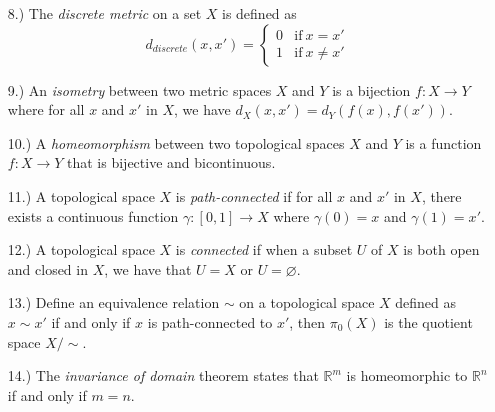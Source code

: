 \documentclass[12pt]{article}
\newcommand{\R}{\mathbb{R}}
\begin{document}
\begin{itemize}
    \item [8.)] The \textit{discrete metric} on a set $X$ is defined as
    \[
        d_{discrete}(x,x') = \begin{cases}
            0 & \text{if}\ x = x' \\
            1 & \text{if}\ x \ne x'
        \end{cases}
    \]

    \item [9.)] An \textit{isometry} between two metric spaces $X$ and $Y$ is
    a bijection $f:X \to Y$ where for all $x$ and $x'$ in $X$, we have
    $d_X(x, x') = d_Y(f(x), f(x'))$.

    \item [10.)] A \textit{homeomorphism} between two topological spaces $X$
    and $Y$ is a function $f:X \to Y$ that is bijective and bicontinuous.

    \item [11.)] A topological space $X$ is \textit{path-connected} if for all
    $x$ and $x'$ in $X$, there exists a continuous function
    $\gamma : [0,1] \to X$ where $\gamma(0) = x$ and $\gamma(1) = x'$.

    \item [12.)] A topological space $X$ is \textit{connected} if when a
    subset $U$ of $X$ is both open and closed in $X$, we have that $U = X$ or
    $U = \varnothing$.

    \item [13.)] Define an equivalence relation $\sim$ on a topological space
    $X$ defined as $x \sim x'$ if and only if $x$ is path-connected to $x'$,
    then $\pi_0(X)$ is the quotient space $X/{\sim}$.

    \item [14.)] The \textit{invariance of domain} theorem states that $\R^m$
    is homeomorphic to $\R^n$ if and only if $m = n$.
\end{itemize}
\end{document}
